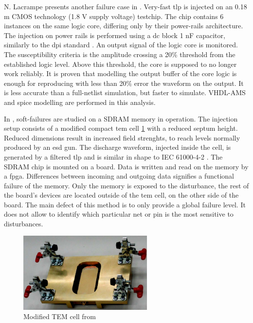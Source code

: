 N. Lacrampe presents another failure case in \cite{LacrampeTransientImmunity}.
Very-fast \gls{tlp} is injected on an 0.18 \textmu{}m CMOS technology (1.8 V supply voltage) testchip.
The chip contains 6 instances on the same logic core, differing only by their power-rails architecture.
The injection on power rails is performed using a \gls{dc} block 1 nF capacitor, similarly to the \gls{dpi} standard \cite{iec62132-4}.
An output signal of the logic core is monitored.
The susceptibility criteria is the amplitude crossing a 20\% threshold from the established logic level.
Above this threshold, the core is supposed to no longer work reliably.
It is proven that modelling the output buffer of the core logic is enough for reproducing with less than 20\% error the waveform on the output.
It is less accurate than a full-netlist simulation, but faster to simulate.
VHDL-AMS and \gls{spice} modelling are performed in this analysis.

In \cite{SDRAMCase}, soft-failures are studied on a SDRAM memory in operation.
The injection setup consists of a modified compact \gls{tem} cell \ref{fig:modified-tem-cell} with a reduced septum height.
Reduced dimensions result in increased field strenghts, to reach levels normally produced by an \gls{esd} gun.
The discharge waveform, injected inside the cell, is generated by a filtered \gls{tlp} and is similar in shape to IEC 61000-4-2 \cite{iec61000-4-2}.
The SDRAM chip is mounted on a board.
Data is written and read on the memory by a \gls{fpga}.
Differences between incoming and outgoing data signifies a functional failure of the memory.
Only the memory is exposed to the disturbance, the rest of the board's devices are located outside of the \gls{tem} cell, on the other side of the board.
The main defect of this method is to only provide a global failure level.
It does not allow to identify which particular net or pin is the most sensitive to disturbances.

\begin{figure}[!h]
  \centering
  \includegraphics[width=0.6\textwidth]{src/1/figures/modified_tem_cell.png}
  \caption{Modified TEM cell from \cite{SDRAMCase}}
  \label{fig:modified-tem-cell}
\end{figure}

